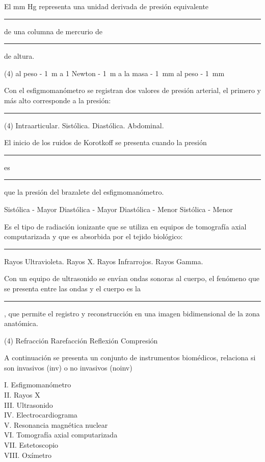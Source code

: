 \documentclass[12pt, letter]{exam}
\begin{document}
\begin{questions}
    \newpage

    \question El mm Hg representa una unidad derivada de presión equivalente \rule{2cm}{0.1mm} de una columna de mercurio de \rule{2cm}{0.1mm} de altura.
    \begin{tasks}(4)
        \task al peso - \SI{1}{\meter}
        \task a 1 Newton - \SI{1}{\meter}
        \task a la masa - \SI{1}{\milli\meter}
        \task al peso - \SI{1}{\milli\meter}
    \end{tasks}
    \question Con el esfigmomanómetro se registran dos valores de presión arterial, el primero y más alto corresponde a la presión: \rule{2cm}{0.1mm}
    \begin{tasks}(4)
        \task Intraarticular.
        \task Sistólica.
        \task Diastólica.
        \task Abdominal.
    \end{tasks}
    \question El inicio de los ruidos de Korotkoff se presenta cuando la presión \rule{2cm}{0.1mm} es \rule{2cm}{0.1mm} que la presión del brazalete del esfigmomanómetro.
    \begin{multicols}{2}
    \begin{tasks}
        \task Sistólica - Mayor
        \task Diastólica - Mayor
        \task Diastólica - Menor
        \task Sistólica - Menor
    \end{tasks}
    \end{multicols}
    \question Es el tipo de radiación ionizante que se utiliza en equipos de tomografía axial computarizada y que es absorbida por el tejido biológico: \rule{2cm}{0.1mm}
    \begin{multicols}{2}
    \begin{tasks}
        \task Rayos Ultravioleta.
        \task Rayos X.
        \task Rayos Infrarrojos.
        \task Rayos Gamma.
    \end{tasks}
    \end{multicols}
    \question Con un equipo de ultrasonido se envían ondas sonoras al cuerpo, el fenómeno que se presenta entre las ondas y el cuerpo es la \rule{2cm}{0.1mm}, que permite el registro y reconstrucción en una imagen bidimensional de la zona anatómica.
    \begin{tasks}(4)
        \task Refracción
        \task Rarefacción
        \task Reflexión
        \task Compresión
    \end{tasks}
    \question A continuación se presenta un conjunto de instrumentos biomédicos, relaciona si son invasivos (inv) o no invasivos (noinv)
    \begin{multicols}{2}
        I. Esfigmomanómetro \\
        II. Rayos X  \\
        III. Ultrasonido \\
        IV. Electrocardiograma \\
        V. Resonancia magnética nuclear \\
        VI. Tomografía axial computarizada \\
        VII. Estetoscopio \\
        VIII. Oxímetro
    \end{multicols}


\end{questions}
\end{document}
